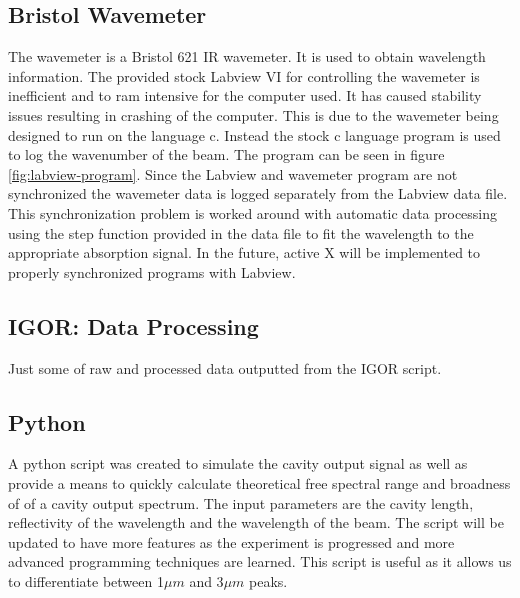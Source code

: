 \documentclass[11pt,a4paper]{book}
\newcommand{\imginput}[1]{} %
\begin{document}
		\subsection{Bristol Wavemeter}
			The wavemeter is a Bristol 621 IR wavemeter. It is used to obtain wavelength information. The provided stock Labview VI for controlling the wavemeter is inefficient and to ram intensive for the computer used. It has caused stability issues resulting in crashing of the computer. This is due to the wavemeter being designed to run on the language c. Instead the stock c language program is used to log the wavenumber of the beam. The program can be seen in figure \autoref{fig:labview-program}. Since the Labview and wavemeter program are not synchronized the wavemeter data is logged separately from the Labview data file. This synchronization problem is worked around with automatic data processing using the step function provided in the data file to fit the wavelength to the appropriate absorption signal. In the future, active X will be implemented to properly synchronized programs with Labview.
			
			\subsection{IGOR: Data Processing}
			
			Just some of raw and processed data outputted from the IGOR script.
			
			\begin{figure} [!ht]
				\centering
				\resizebox{160mm}{!}{\imginput{images/igor-process.pdf_tex}}
				\caption{}
				\label{fig:igor-process}
				
			\end{figure}
			
		\subsection{Python}
			A python script was created to simulate the cavity output signal as well as provide a means to quickly calculate theoretical free spectral range and broadness of of a cavity output spectrum. The input parameters are the cavity length, reflectivity of the wavelength and the wavelength of the beam. The script will be updated to have more features as the experiment is progressed and more advanced programming techniques are learned. This script is useful as it allows us to differentiate between 1$\mu m$ and 3$\mu m$ peaks.
			
\end{document}
